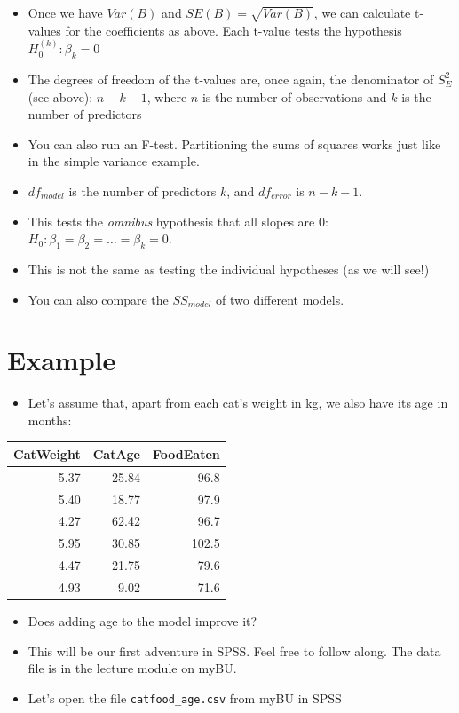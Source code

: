 \documentclass[]{article}
\providecommand{\tightlist}{%
  \setlength{\itemsep}{0pt}\setlength{\parskip}{0pt}}
\begin{document}
\begin{itemize}
\tightlist
\item
  Once we have \(Var(B)\) and \(SE(B) = \sqrt{Var(B)}\), we can
  calculate t-values for the coefficients as above. Each t-value tests
  the hypothesis \(H_0^{(k)}: \beta_k = 0\)
\item
  The degrees of freedom of the t-values are, once again, the
  denominator of \(S_E^2\) (see above): \(n-k-1\), where \(n\) is the
  number of observations and \(k\) is the number of predictors
\item
  You can also run an F-test. Partitioning the sums of squares works
  just like in the simple variance example.
\item
  \(df_{model}\) is the number of predictors \(k\), and \(df_{error}\)
  is \(n-k-1\).
\item
  This tests the \emph{omnibus} hypothesis that all slopes are 0:
  \(H_0: \beta_1 = \beta_2 = \dots = \beta_k = 0\).
\item
  This is not the same as testing the individual hypotheses (as we will
  see!)
\item
  You can also compare the \(SS_{model}\) of two different models.
\end{itemize}

\section{Example}\label{example-1}

\begin{itemize}
\tightlist
\item
  Let's assume that, apart from each cat's weight in kg, we also have
  its age in months:
\end{itemize}

\begin{longtable}[]{@{}rrr@{}}
\toprule
CatWeight & CatAge & FoodEaten\tabularnewline
\midrule
\endhead
5.37 & 25.84 & 96.8\tabularnewline
5.40 & 18.77 & 97.9\tabularnewline
4.27 & 62.42 & 96.7\tabularnewline
5.95 & 30.85 & 102.5\tabularnewline
4.47 & 21.75 & 79.6\tabularnewline
4.93 & 9.02 & 71.6\tabularnewline
\bottomrule
\end{longtable}

\begin{itemize}
\tightlist
\item
  Does adding age to the model improve it?
\item
  This will be our first adventure in SPSS. Feel free to follow along.
  The data file is in the lecture module on myBU.
\item
  Let's open the file \texttt{catfood\_age.csv} from myBU in SPSS
\end{itemize}
\end{document}

